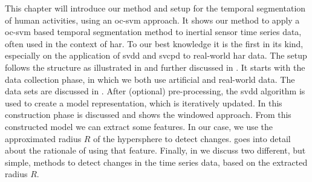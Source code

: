 This chapter will introduce our method and setup for the temporal segmentation of human activities, using an \gls{oc-svm} approach.
It shows our method to apply a \gls{oc-svm} based temporal segmentation method to inertial sensor time series data, often used in the context of \acrlong{har}.
To our best knowledge it is the first in its kind, especially on the application of \gls{svdd} and \gls{svcpd} to real-world \gls{har} data.
The setup follows the structure as illustrated in  and further discussed in .
It starts with the data collection phase, in which we both use artificial and real-world data.
The data sets are discussed in .
After (optional) pre-processing, the \gls{svdd} algorithm is used to create a model representation, which is iteratively updated.
In  this construction phase is discussed and shows the windowed approach.
From this constructed model we can extract some features.
In our case, we use the approximated radius $R$ of the hypersphere to detect changes.
 goes into detail about the rationale of using that feature.
Finally, in  we discuss two different, but simple, methods to detect changes in the time series data, based on the extracted radius $R$.





